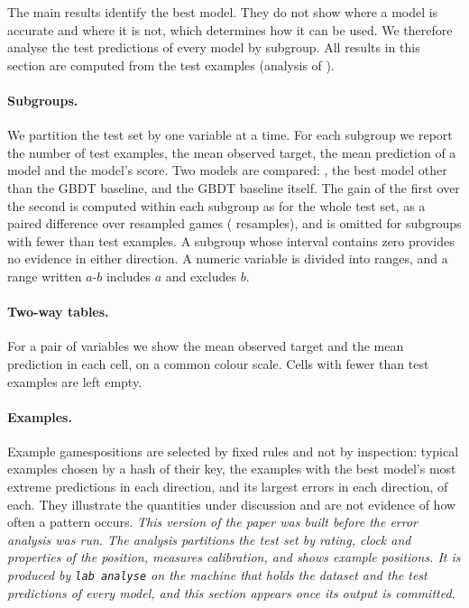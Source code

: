 \iflook
The main results identify the best model. They do not show where a model is
accurate and where it is not, which determines how it can be used. We
therefore analyse the test predictions of every model by subgroup. All
results in this section are computed from the  test
examples (analysis of ).

\paragraph{Subgroups.}
We partition the test set by one variable at a time. For each subgroup we
report the number of test examples, the mean observed target, the mean
prediction of a model and the model's score. Two models are compared:
, the best model other than the GBDT baseline, and the
GBDT baseline itself. The gain of the first over the second is computed
within each subgroup as for the whole test set, as a paired difference over
resampled games ( resamples), and is omitted for subgroups
with fewer than  test examples. A subgroup whose
interval contains zero provides no evidence in either direction. A numeric
variable is divided into ranges, and a range written $a$-$b$ includes $a$ and
excludes $b$.

\paragraph{Two-way tables.}
For a pair of variables we show the mean observed target and the mean
prediction in each cell, on a common colour scale. Cells with fewer than
 test examples are left empty.

\paragraph{Examples.}
Example \ifsequence games\else positions\fi{} are selected by fixed rules and
not by inspection: typical examples chosen by a hash of their key, the
examples with the best model's most extreme predictions in each direction,
and its largest errors in each direction,  of each. They
illustrate the quantities under discussion and are not evidence of how often
a pattern occurs.
\else
\emph{This version of the paper was built before the error analysis was run.
The analysis partitions the test set by rating, clock and properties of the
position, measures calibration, and shows example positions. It is produced
by \texttt{lab analyse} on the machine that holds the dataset and the test
predictions of every model, and this section appears once its output is
committed.}
\fi

